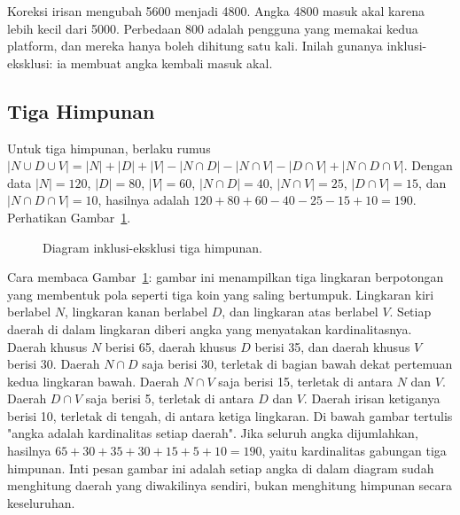 \documentclass[11pt,a4paper]{article}
\begin{document}
Koreksi irisan mengubah 5600 menjadi 4800. Angka 4800 masuk akal karena lebih kecil dari 5000. Perbedaan 800 adalah pengguna yang memakai kedua platform, dan mereka hanya boleh dihitung satu kali. Inilah gunanya inklusi-eksklusi: ia membuat angka kembali masuk akal.

\subsection{Tiga Himpunan}

Untuk tiga himpunan, berlaku rumus $|N \cup D \cup V|=|N|+|D|+|V|-|N \cap D|-|N \cap V|-|D \cap V|+|N \cap D \cap V|$. Dengan data $|N|=120$, $|D|=80$, $|V|=60$, $|N \cap D|=40$, $|N \cap V|=25$, $|D \cap V|=15$, dan $|N \cap D \cap V|=10$, hasilnya adalah $120+80+60-40-25-15+10=190$. Perhatikan Gambar~\ref{fig:tiga-himpunan}.

\begin{figure}[H]
	\centering
	\caption{Diagram inklusi-eksklusi tiga himpunan.}
	\label{fig:tiga-himpunan}
\end{figure}

Cara membaca Gambar~\ref{fig:tiga-himpunan}: gambar ini menampilkan tiga lingkaran berpotongan yang membentuk pola seperti tiga koin yang saling bertumpuk. Lingkaran kiri berlabel $N$, lingkaran kanan berlabel $D$, dan lingkaran atas berlabel $V$. Setiap daerah di dalam lingkaran diberi angka yang menyatakan kardinalitasnya. Daerah khusus $N$ berisi 65, daerah khusus $D$ berisi 35, dan daerah khusus $V$ berisi 30. Daerah $N \cap D$ saja berisi 30, terletak di bagian bawah dekat pertemuan kedua lingkaran bawah. Daerah $N \cap V$ saja berisi 15, terletak di antara $N$ dan $V$. Daerah $D \cap V$ saja berisi 5, terletak di antara $D$ dan $V$. Daerah irisan ketiganya berisi 10, terletak di tengah, di antara ketiga lingkaran. Di bawah gambar tertulis "angka adalah kardinalitas setiap daerah". Jika seluruh angka dijumlahkan, hasilnya $65+30+35+30+15+5+10=190$, yaitu kardinalitas gabungan tiga himpunan. Inti pesan gambar ini adalah setiap angka di dalam diagram sudah menghitung daerah yang diwakilinya sendiri, bukan menghitung himpunan secara keseluruhan.
\end{document}
